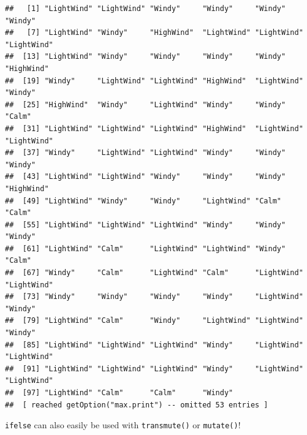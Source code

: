 \documentclass[
]{book}
\newenvironment{Shaded}{\begin{snugshade}}{\end{snugshade}}
\newcommand{\DecValTok}[1]{\textcolor[rgb]{0.00,0.00,0.81}{#1}}
\newcommand{\KeywordTok}[1]{\textcolor[rgb]{0.13,0.29,0.53}{\textbf{#1}}}
\newcommand{\NormalTok}[1]{#1}
\newcommand{\OperatorTok}[1]{\textcolor[rgb]{0.81,0.36,0.00}{\textbf{#1}}}
\newcommand{\StringTok}[1]{\textcolor[rgb]{0.31,0.60,0.02}{#1}}
\theoremstyle{definition}
\theoremstyle{definition}
\theoremstyle{definition}
\theoremstyle{remark}
\begin{document}
\begin{Shaded}
\end{Shaded}

\begin{verbatim}
##   [1] "LightWind" "LightWind" "Windy"     "Windy"     "Windy"     "Windy"    
##   [7] "LightWind" "Windy"     "HighWind"  "LightWind" "LightWind" "LightWind"
##  [13] "LightWind" "Windy"     "Windy"     "Windy"     "Windy"     "HighWind" 
##  [19] "Windy"     "LightWind" "LightWind" "HighWind"  "LightWind" "Windy"    
##  [25] "HighWind"  "Windy"     "LightWind" "Windy"     "Windy"     "Calm"     
##  [31] "LightWind" "LightWind" "LightWind" "HighWind"  "LightWind" "LightWind"
##  [37] "Windy"     "LightWind" "LightWind" "Windy"     "Windy"     "Windy"    
##  [43] "LightWind" "LightWind" "Windy"     "Windy"     "Windy"     "HighWind" 
##  [49] "LightWind" "Windy"     "Windy"     "LightWind" "Calm"      "Calm"     
##  [55] "LightWind" "LightWind" "LightWind" "Windy"     "Windy"     "Windy"    
##  [61] "LightWind" "Calm"      "LightWind" "LightWind" "Windy"     "Calm"     
##  [67] "Windy"     "Calm"      "LightWind" "Calm"      "LightWind" "LightWind"
##  [73] "Windy"     "Windy"     "Windy"     "Windy"     "LightWind" "Windy"    
##  [79] "LightWind" "Calm"      "Windy"     "LightWind" "LightWind" "Windy"    
##  [85] "LightWind" "LightWind" "LightWind" "Windy"     "LightWind" "LightWind"
##  [91] "LightWind" "LightWind" "LightWind" "Windy"     "LightWind" "LightWind"
##  [97] "LightWind" "Calm"      "Calm"      "Windy"    
##  [ reached getOption("max.print") -- omitted 53 entries ]
\end{verbatim}

\texttt{ifelse} can also easily be used with \texttt{transmute()} or \texttt{mutate()}!
\end{document}
